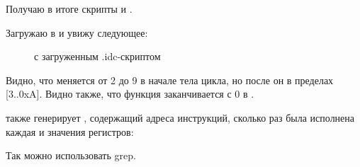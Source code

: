 Получаю в итоге скрипты  и .

\clearpage
Загружаю  в \IDA и увижу следующее:

\begin{figure}[H]
\centering
{}
\caption{\IDA с загруженным .idc-скриптом}
\label{fig:loops_IDA_tracer}
\end{figure}

Видно, что \ESI меняется от 2 до 9 в начале тела цикла, но после 
 он в пределах [3..0xA].
Видно также, что функция \main заканчивается с 0 в \EAX.

\tracer также генерирует , 
содержащий адреса инструкций, сколько раз была исполнена
каждая и значения регистров:


\myindex{\GrepUsage}
Так можно использовать grep.
